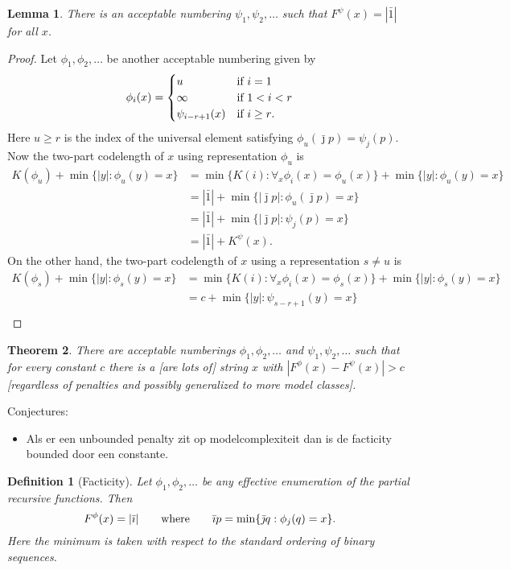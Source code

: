 \documentclass{article}
\newtheorem{theorem}{Theorem}
\newtheorem{lemma}[theorem]{Lemma}
\newtheorem{definition}{Definition}
\newcommand{\tn}[1]{\textnormal{#1}}
\begin{document}
\begin{lemma}
There is an acceptable numbering $\psi_1,\psi_2,\ldots$ such that $F^\psi(x)=|\bar 1|$ for all $x$.
\end{lemma}
\begin{proof}
Let $\phi_1,\phi_2,\ldots$ be another acceptable numbering given by
\[
\phi_i(x)=\begin{cases}
u&\tn{if $i=1$}\\
\infty&\tn{if $1<i<r$}\\
\psi_{i-r+1}(x)&\tn{if $i\ge r$}.
\end{cases}\]
Here $u\ge r$ is the index of the universal element satisfying $\phi_u(\bar\jmath p)=\psi_j(p)$.
Now the two-part codelength of $x$ using representation $\phi_u$ is
\[\begin{split}
K(\phi_u)+\min\{|y|:\phi_u(y)=x\}&=\min\{K(i):\forall_x\phi_i(x)=\phi_u(x)\}+\min\{|y|:\phi_u(y)=x\}\\
&=|\bar 1|+\min\{|\bar\jmath p|:\phi_u(\bar\jmath p)=x\}\\
&=|\bar 1|+\min\{|\bar\jmath p|:\psi_j(p)=x\}\\
&=|\bar 1|+K^\psi(x).
\end{split}\]
On the other hand, the two-part codelength of $x$ using a representation $s\ne u$ is
\[\begin{split}
K(\phi_s)+\min\{|y|:\phi_s(y)=x\}&=\min\{K(i):\forall_x\phi_i(x)=\phi_s(x)\}+\min\{|y|:\phi_s(y)=x\}\\
&=c+\min\{|y|:\psi_{s-r+1}(y)=x\}\\
\end{split}\]

\end{proof}


\begin{theorem}
  There are acceptable numberings $\phi_1,\phi_2,\ldots$ and $\psi_1,\psi_2,\ldots$ such that for every constant $c$ there is a [are lots of] string $x$ with $|F^\phi(x)-F^\psi(x)|>c$ [regardless of penalties and possibly generalized to more model classes].
\end{theorem}

Conjectures:
\begin{itemize}
\item Als er een unbounded penalty zit op modelcomplexiteit dan is de facticity bounded door een constante.
\end{itemize}

\begin{definition}[Facticity]
  Let $\phi_1,\phi_2,\ldots$ be any effective enumeration of the partial recursive functions. Then
  \[F^\phi(x)=|\bar\imath|\qquad\tn{where}\qquad \bar\imath p=\min\{\bar\jmath q:\phi_j(q)=x\}.
  \]
  Here the minimum is taken with respect to the standard ordering of binary sequences.
\end{definition}
\end{document}
